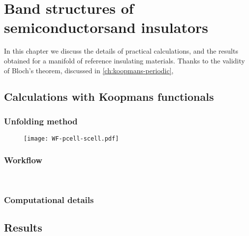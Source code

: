 \cleardoublepage
\chapter[Band structures of semiconductors and insulators]{Band structures of semiconductors\break and insulators\label{ch:band-structures}}
In this chapter we discuss the details of practical calculations, and the results obtained for a manifold of reference insulating materials. Thanks to the validity of Bloch's theorem, discussed in \cref{ch:koopmans-periodic},

\cleardoublepage
\section{Calculations with Koopmans functionals\label{sec:calculations-koopmans}}

\subsection{Unfolding method\label{sec:unfolding-method}}

\begin{figure}
    \centering
    \texttt{[image: WF-pcell-scell.pdf]}
    \caption[]{}
    \label{fig:map-wf}
\end{figure}


\subsection{Workflow\label{sec:workflow}}

\begin{figure}
    \centering
     \\
    \caption[]{}
    \label{fig:workflow}
\end{figure}

\subsection{Computational details\label{sec:computational-details}}

\section{Results\label{sec:results-bands}}

